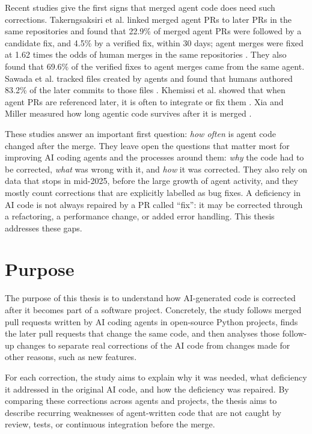 Recent studies give the first signs that merged agent code does need such
corrections. Takerngsaksiri et al. linked merged agent PRs to later PRs in the
same repositories and found that 22.9\% of merged agent PRs were followed by a
candidate fix, and 4.5\% by a verified fix, within 30 days; agent merges were
fixed at 1.62 times the odds of human merges in the same repositories
\cite{takerngsaksiri2026finishes}. They also found that 69.6\% of the verified
fixes to agent merges came from the same agent. Sawada et al. tracked files
created by agents and found that humans authored 83.2\% of the later commits to
those files \cite{sawada2026maintenance}. Khemissi et al. showed that when
agent PRs are referenced later, it is often to integrate or fix them
\cite{khemissi2026humans}. Xia and Miller measured how long agentic code
survives after it is merged \cite{xia2026postmerge}.

These studies answer an important first question: \emph{how often} is agent code
changed after the merge. They leave open the questions that matter most for
improving AI coding agents and the processes around them: \emph{why} the code had
to be corrected, \emph{what} was wrong with it, and \emph{how} it was corrected.
They also rely on data that stops in mid-2025, before the large growth of agent
activity, and they mostly count corrections that are explicitly labelled as bug
fixes. A deficiency in AI code is not always repaired by a PR called ``fix'': it
may be corrected through a refactoring, a performance change, or added error
handling. This thesis addresses these gaps.

\section{Purpose}
\label{sec:purpose}

The purpose of this thesis is to understand how AI-generated code is corrected
after it becomes part of a software project. Concretely, the study follows
merged pull requests written by AI coding agents in open-source Python
projects, finds the later pull requests that change the same code, and then
analyses those follow-up changes to separate real corrections of the AI code from
changes made for other reasons, such as new features.

For each correction, the study aims to explain why it was needed, what
deficiency it addressed in the original AI code, and how the deficiency was
repaired. By comparing these corrections across agents and projects, the thesis
aims to describe recurring weaknesses of agent-written code that are not caught
by review, tests, or continuous integration before the merge.

